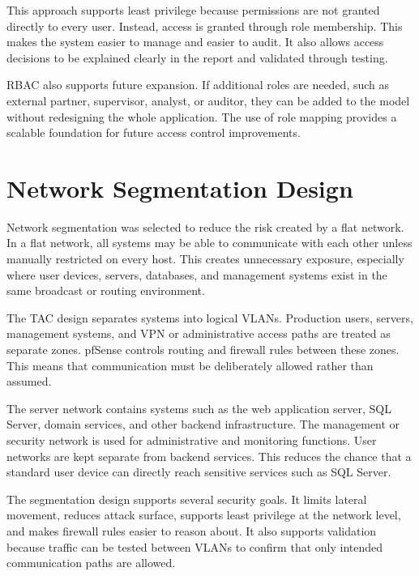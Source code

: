 This approach supports least privilege because permissions are not granted directly to every user. Instead, access is granted through role membership. This makes the system easier to manage and easier to audit. It also allows access decisions to be explained clearly in the report and validated through testing.

RBAC also supports future expansion. If additional roles are needed, such as external partner, supervisor, analyst, or auditor, they can be added to the model without redesigning the whole application. The use of role mapping provides a scalable foundation for future access control improvements.


\section{Network Segmentation Design}

Network segmentation was selected to reduce the risk created by a flat network. In a flat network, all systems may be able to communicate with each other unless manually restricted on every host. This creates unnecessary exposure, especially where user devices, servers, databases, and management systems exist in the same broadcast or routing environment.

The TAC design separates systems into logical VLANs. Production users, servers, management systems, and VPN or administrative access paths are treated as separate zones. pfSense controls routing and firewall rules between these zones. This means that communication must be deliberately allowed rather than assumed.

The server network contains systems such as the web application server, SQL Server, domain services, and other backend infrastructure. The management or security network is used for administrative and monitoring functions. User networks are kept separate from backend services. This reduces the chance that a standard user device can directly reach sensitive services such as SQL Server.

The segmentation design supports several security goals. It limits lateral movement, reduces attack surface, supports least privilege at the network level, and makes firewall rules easier to reason about. It also supports validation because traffic can be tested between VLANs to confirm that only intended communication paths are allowed.

